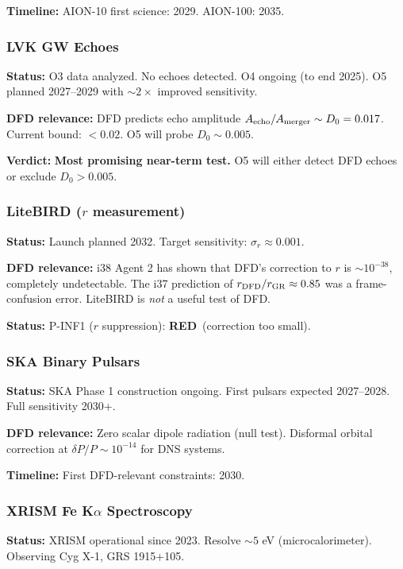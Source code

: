 \documentclass[11pt,a4paper]{article}
\newcommand{\RED}{\textcolor{dfdred}{\textbf{RED}}}
\begin{document}
\textbf{Timeline:} AION-10 first science: 2029. AION-100: 2035.

\subsubsection{LVK GW Echoes}

\textbf{Status:} O3 data analyzed. No echoes detected. O4 ongoing (to end 2025). O5 planned 2027--2029 with $\sim 2\times$ improved sensitivity.

\textbf{DFD relevance:} DFD predicts echo amplitude $A_{\rm echo}/A_{\rm merger} \sim D_0 = 0.017$. Current bound: $< 0.02$. O5 will probe $D_0 \sim 0.005$.

\textbf{Verdict:} \textbf{Most promising near-term test.} O5 will either detect DFD echoes or exclude $D_0 > 0.005$.

\subsubsection{LiteBIRD ($r$ measurement)}

\textbf{Status:} Launch planned 2032. Target sensitivity: $\sigma_r \approx 0.001$.

\textbf{DFD relevance:} i38 Agent 2 has shown that DFD's correction to $r$ is $\sim 10^{-38}$, completely undetectable. The i37 prediction of $r_{\rm DFD}/r_{\rm GR} \approx 0.85$ was a frame-confusion error. LiteBIRD is \emph{not} a useful test of DFD.

\textbf{Status:} P-INF1 ($r$ suppression): \RED\ (correction too small).

\subsubsection{SKA Binary Pulsars}

\textbf{Status:} SKA Phase 1 construction ongoing. First pulsars expected 2027--2028. Full sensitivity 2030+.

\textbf{DFD relevance:} Zero scalar dipole radiation (null test). Disformal orbital correction at $\delta P/P \sim 10^{-14}$ for DNS systems.

\textbf{Timeline:} First DFD-relevant constraints: 2030.

\subsubsection{XRISM Fe K$\alpha$ Spectroscopy}

\textbf{Status:} XRISM operational since 2023. Resolve $\sim 5$ eV (microcalorimeter). Observing Cyg X-1, GRS 1915+105.
\end{document}
